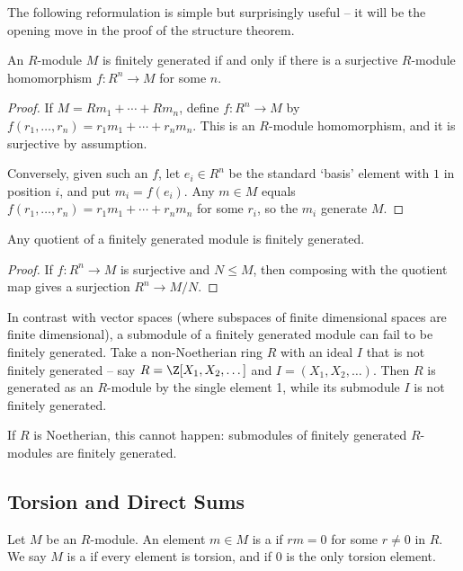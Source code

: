 The following reformulation is simple but surprisingly useful -- it will be the opening move in the proof of the structure theorem.

\begin{lemma}
	An $R$-module $M$ is finitely generated if and only if there is a surjective $R$-module homomorphism $f: R^n \rightarrow M$ for some $n$.
\end{lemma}
\begin{proof}
	If $M = Rm_1 + \cdots + Rm_n$, define $f: R^n \rightarrow M$ by $f(r_1, \dots, r_n) = r_1 m_1 + \cdots + r_n m_n$. This is an $R$-module homomorphism, and it is surjective by assumption.

	Conversely, given such an $f$, let $e_i \in R^n$ be the standard `basis' element with $1$ in position $i$, and put $m_i = f(e_i)$. Any $m \in M$ equals $f(r_1, \dots, r_n) = r_1 m_1 + \cdots + r_n m_n$ for some $r_i$, so the $m_i$ generate $M$.
\end{proof}

\begin{corollary}
	Any quotient of a finitely generated module is finitely generated.
\end{corollary}
\begin{proof}
	If $f : R^n \rightarrow M$ is surjective and $N \leq M$, then composing with the quotient map gives a surjection $R^n \rightarrow M/N$.
\end{proof}

\begin{example}
	In contrast with vector spaces (where subspaces of finite dimensional spaces are finite dimensional), a submodule of a finitely generated module can fail to be finitely generated. Take a non-Noetherian ring $R$ with an ideal $I$ that is not finitely generated -- say $R = \Z[X_1, X_2, \dots]$ and $I = (X_1, X_2, \dots)$. Then $R$ is generated as an $R$-module by the single element 1, while its submodule $I$ is not finitely generated.

	If $R$ is Noetherian, this cannot happen: submodules of finitely generated $R$-modules are finitely generated.
\end{example}

\subsection{Torsion and Direct Sums}

\begin{definition}[Torsion]
	Let $M$ be an $R$-module. An element $m \in M$ is a  if $rm = 0$ for some $r \neq 0$ in $R$. We say $M$ is a  if every element is torsion, and  if $0$ is the only torsion element.
\end{definition}

